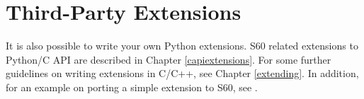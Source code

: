 \section{Third-Party Extensions}
\label{subsec:third}

It is also possible to write your own Python extensions. S60 related
extensions to Python/C API are described in Chapter
\ref{capiextensions}. For some further guidelines on writing
extensions in C/C++, see Chapter \ref{extending}. In
addition, for an example on porting a simple extension to S60, see
\cite{PyS60Prog}.
